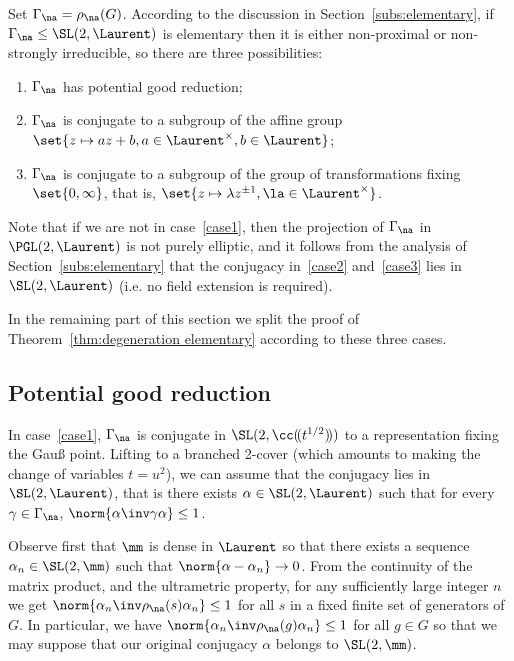 Set $\Gamma_\na = \rho_\na(G)$. According to the discussion in Section~\ref{subs:elementary}, if $\Gamma_\na \leq \SL(2, \Laurent)$ is elementary then it is either non-proximal or non-strongly irreducible, so there are three possibilities:
\begin{enumerate}
\item \label{case1} $\Gamma_\na $ has potential good reduction;
\item \label{case2} $\Gamma_\na $ is conjugate to a subgroup of the affine group $\set{z\mapsto az+b, a\in \Laurent^\times, b\in \Laurent}$;
\item \label{case3} $\Gamma_\na $ is conjugate to a subgroup of the group of transformations fixing $\set{0, \infty}$, that is, $\set{z\mapsto \lambda z^{\pm1}, \la\in \Laurent^\times}$.
\end{enumerate}

Note that if we are not in case~\eqref{case1}, then the projection of $\Gamma_\na$ in $\PGL(2, \Laurent)$ is not purely elliptic, and it follows from the analysis of Section~\ref{subs:elementary} that the conjugacy in~\eqref{case2} and~\eqref{case3} lies in $\SL(2, \Laurent)$ (i.e. no field extension is required).

In the remaining part of this section we split the proof of Theorem~\ref{thm:degeneration elementary} according to these three cases.

\subsection{Potential good reduction}

In case~\eqref{case1}, $\Gamma_\na $ is conjugate in $\SL(2, \cc(\!(t^{1/2})\!))$ to a representation fixing the Gau{\ss} point. Lifting to a branched 2-cover (which amounts to making the change of variables $t= u^2$), we can assume that the conjugacy lies in $\SL(2, \Laurent)$, that is there exists $\alpha\in \SL(2, \Laurent)$ such that for every $\gamma\in \Gamma_\na$, $\norm{\alpha\inv\gamma\alpha}\leq 1$.

Observe first that $\mm$ is dense in $\Laurent$ so that there exists a sequence $\alpha_n \in \SL(2,\mm)$ such that $\norm{\alpha - \alpha_n} \to0$. From the continuity of the matrix product, and the ultrametric property, for any sufficiently large integer $n$ we get $\norm{\alpha_n\inv\rho_{\na}(s)\alpha_n}\leq 1$ for all $s$ in a fixed finite set of generators of $G$. In particular, we have $\norm{\alpha_n\inv\rho_{\na}(g)\alpha_n}\leq 1$ for all $g \in G$ so that we may suppose that our original conjugacy $\alpha$ belongs to $\SL(2,\mm)$.

